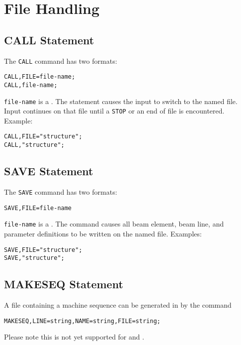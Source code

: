 \section{File Handling} 
 
\subsection{CALL Statement}
\label{sec:call}
The \texttt{CALL} command has two formats:
\begin{verbatim}
CALL,FILE=file-name;
CALL,file-name;
\end{verbatim}
\texttt{file-name} is a .
The statement causes the input to switch to the named file.
Input continues on that file until a \texttt{STOP} or an end of file
is encountered. 
\noindent Example:
\begin{verbatim}
CALL,FILE="structure";
CALL,"structure";
\end{verbatim}

\subsection{SAVE Statement}
\label{sec:save}
The \texttt{SAVE} command has two formats:
\begin{verbatim}
SAVE,FILE=file-name
\end{verbatim}
\texttt{file-name} is a .
The command causes all beam element, beam line, and parameter definitions
to be written on the named file.
\noindent Examples:
\begin{verbatim}
SAVE,FILE="structure";
SAVE,"structure";
\end{verbatim}

\subsection{MAKESEQ Statement}
\label{sec:makeseq}
A file containing a machine sequence can be generated in \opal by the
command 
\begin{verbatim}
MAKESEQ,LINE=string,NAME=string,FILE=string;
\end{verbatim}

Please note this is not yet supported for \noopalt and \noopalcycl .


